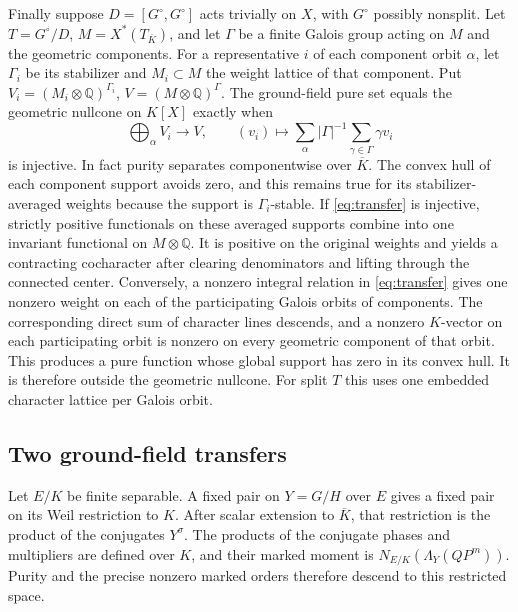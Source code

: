 \documentclass[11pt]{article}
\newcommand{\QQ}{\mathbb Q}
\begin{document}
Finally suppose \(D=[G^\circ,G^\circ]\) acts trivially on \(X\),
with \(G^\circ\) possibly nonsplit. Let \(T=G^\circ/D\), \(M=X^*(T_{\overline K})\), and let
\(\Gamma\) be a finite Galois group acting on \(M\) and the geometric
components. For a representative \(i\) of each component orbit
\(\alpha\), let \(\Gamma_i\) be its stabilizer and \(M_i\subset M\)
the weight lattice of that component. Put
\(V_i=(M_i\otimes\QQ)^{\Gamma_i}\), \(V=(M\otimes\QQ)^\Gamma\).
The ground-field pure set equals the geometric nullcone on \(K[X]\)
exactly when
\begin{equation}\label{eq:transfer}
 \bigoplus_\alpha V_i\longrightarrow V,\qquad
 (v_i)\longmapsto\sum_\alpha|\Gamma|^{-1}
                                  \sum_{\gamma\in\Gamma}\gamma v_i
\end{equation}
is injective. In fact purity separates componentwise over
\(\overline K\). The convex hull of each component support avoids
zero, and this remains true for its stabilizer-averaged weights
because the support is \(\Gamma_i\)-stable. If \eqref{eq:transfer}
is injective, strictly positive functionals on these averaged
supports combine into one invariant functional on \(M\otimes\QQ\).
It is positive on the original weights and yields a contracting
cocharacter after clearing denominators and lifting through the
connected center. Conversely, a nonzero integral relation in
\eqref{eq:transfer} gives one nonzero weight on each of the
participating Galois orbits of components. The corresponding
direct sum of character lines descends, and a nonzero \(K\)-vector
on each participating orbit is nonzero on every geometric
component of that orbit. This produces a pure function whose
global support has zero in its convex hull. It is therefore
outside the geometric nullcone. For split \(T\) this uses one
embedded character lattice per Galois orbit.

\subsection*{Two ground-field transfers}

Let \(E/K\) be finite separable. A fixed pair on \(Y=G/H\) over \(E\)
gives a fixed pair on its Weil restriction to \(K\). After scalar
extension to \(\overline K\), that restriction is the product of
the conjugates \(Y^\sigma\). The products of the conjugate phases
and multipliers are defined over \(K\), and their marked moment
is \(N_{E/K}(\Lambda_Y(QP^m))\). Purity and the precise nonzero
marked orders therefore descend to this restricted space.
\end{document}
